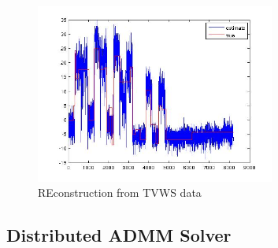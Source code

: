 \documentclass{article}
\begin{document}
\begin{figure}[h]
\centering
\includegraphics[width=0.7\textwidth]{real_reconstruction.jpg}
\caption{REconstruction from TVWS data}
\end{figure}

\subsection{Distributed ADMM Solver}



\end{document}
